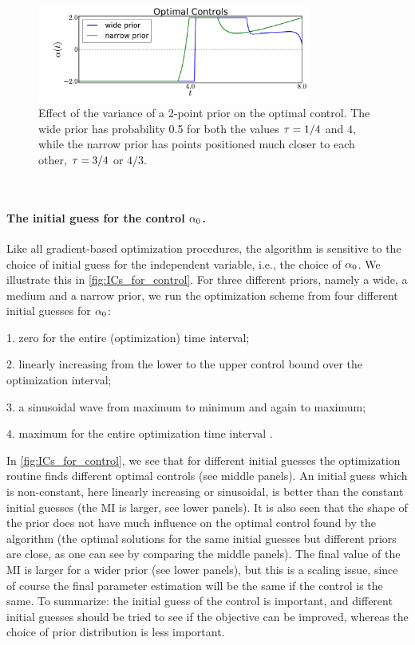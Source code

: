 \begin{figure}[htp]
\begin{center}
  \includegraphics[width=0.8\textwidth]{Figs/AdjointOptimizer/PriorSpread.pdf}
  \caption[Effect of the variance of a prior on the Optimal Control]{Effect of
  the variance of a 2-point prior on the optimal control. The wide prior has probability 0.5 for both the values ${ \tau } =  1/4$
  and $4$, while the narrow prior has points positioned much
   closer to each other, ${ \tau } =   3/4$ or $4/3$.  }
  \label{fig:prior_dispersion_impact} 
\end{center}
\end{figure}

\

\paragraph{The initial guess for the control $\alpha_0$.}

Like all gradient-based optimization procedures, the algorithm is sensitive to the choice
of initial guess for the independent variable, i.e., the choice of
$\alpha_0$. We illustrate this in \cref{fig:ICs_for_control}. For three
different priors, namely a wide, a medium and a narrow prior, we run the
optimization scheme from four different initial guesses for 
$\alpha_0$:

1. zero for the entire (optimization) time interval;

2. linearly increasing from the lower to the upper control bound over the
optimization interval;

3. a sinusoidal wave from maximum to minimum and again to maximum;

4. maximum for the entire optimization time interval .

In \cref{fig:ICs_for_control}, we see that for different initial guesses the
optimization routine finds different optimal controls (see middle panels).  An
initial guess which is non-constant, here linearly increasing or
sinusoidal, is better than the constant initial guesses (the MI is larger, see lower panels). It is also
seen that the shape of the prior does not have much influence on the 
optimal control found by the algorithm (the optimal solutions for the same initial guesses but
different priors are close, as one can see by comparing the middle panels). The final value of
the MI is larger 
for a wider prior (see lower panels), but this is a scaling issue, since of course the
final parameter estimation will be the same if the control is the
same. To summarize: the initial guess of the control is important, and
different initial guesses should be tried to see if the objective can
be improved, whereas the choice of prior distribution is less
important.  

